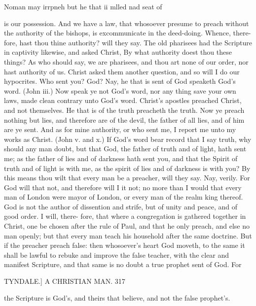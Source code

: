 \documentclass{custom}
\begin{document}
{Noman 
may irrpneh 
but he that 
ii mlled 
nad seat of 

is our possession. And we have a law, that whosoever 
presume to preach without the authority of the bishops, 
is excommunicate in the deed-doing. Whence, there- 
fore, hast thou thine authority? will they say. The old 
pharisees had the Scripture in captivity likewise, and 
asked Christ, By what authority doest thou these things? 
As who should say, we are pharisees, and thou art none of our 
order, nor hast authority of us. Christ asked them another 
question, and so will I do our hypocrites. Who sent you? 
God? Nay, he that is sent of God speaketh God's 
word. (John iii.) Now speak ye not God's word, nor 
any thing save your own laws, made clean contrary unto 
God's word. Christ's apostles preached Christ, and not 
themselves. He that is of the truth preacheth the truth. 
Now ye preach nothing but lies, and therefore are of 
the devil, the father of all lies, and of him are ye sent. 
And as for mine authority, or who sent me, I report me 
unto my works as Christ. (John v. and x.) If God's 
word bear record that I say truth, why should any man 
doubt, but that God, the father of truth and of light, hath 
sent me; as the father of lies and of darkness hath sent 
you, and that the Spirit of truth and of light is with me, 
as the spirit of lies and of darkness is with you? By this 
means thou wilt that every man be a preacher, will they say. 
Nay, verily. For God will that not, and therefore will 
I it not; no more than I would that every man of London 
were mayor of London, or every man of the realm king 
thereof. God is not the author of dissention and strife, 
but of unity and peace, and of good order. I will, there- 
fore, that where a congregation is gathered together in 
Christ, one be chosen after the rule of Paul, and that he 
only preach, and else no man openly; but that every man 
teach his household after the same doctrine. But if the 
preacher preach false: then whosoever's heart God moveth, 
to the same it shall be lawful to rebuke and improve the 
false teacher, with the clear and manifest Scripture, and 
that same is no doubt a true prophet sent of God. For 


TYNDALE.] A CHRISTIAN MAN. 317

the Scripture is God's, and theirs that believe, and not 
the false prophet's. 

}
\end{document}
